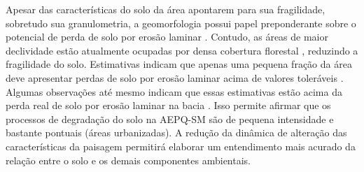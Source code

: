 \documentclass[final]{article}
\begin{document}
Apesar das características do solo da área apontarem para sua fragilidade, sobretudo sua granulometria, a geomorfologia possui papel preponderante sobre o potencial de perda de solo por erosão laminar \cite{Miguel2010}. Contudo, as áreas de maior declividade estão atualmente ocupadas por densa cobertura florestal \cite{SamuelRosaEtAl2011a}, reduzindo a fragilidade do solo. Estimativas indicam que apenas uma pequena fração da área deve apresentar perdas de solo por erosão laminar acima de valores toleráveis \cite{Miguel2010}. Algumas observações até mesmo indicam que essas estimativas estão acima da perda real de solo por erosão laminar na bacia \cite{Branco1998, MouraBueno2012}. Isso permite afirmar que os processos de degradação do solo na AEPQ-SM são de pequena intensidade e bastante pontuais (áreas urbanizadas). A redução da dinâmica de alteração das características da paisagem permitirá elaborar um entendimento mais acurado da relação entre o solo e os demais componentes ambientais.



\end{document}

